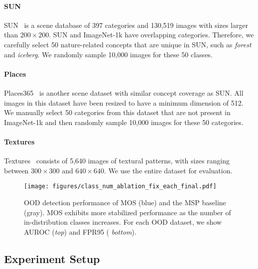 \documentclass[final]{cvpr}
\begin{document}
\paragraph{SUN} SUN~\cite{xiao2010sun} is a scene database of 397 categories and 130,519 images with sizes larger than $200\times200$. 
SUN and ImageNet-1k have overlapping categories. Therefore, we carefully select 50 nature-related concepts that are unique in SUN,  such as \textit{forest} and \textit{iceberg}. We randomly sample 10,000 images for these 50 classes. 
\vspace{-0.4cm}
\paragraph{Places} Places365~\cite{zhou2017places} is another scene dataset with similar concept coverage as SUN. 
All images in this dataset have been resized to have a minimum dimension of 512. We manually select 50 categories from this dataset that are not present in ImageNet-1k and then randomly sample 10,000 images for these 50 categories.

\vspace{-0.5cm}
\paragraph{Textures}  Textures~\cite{cimpoi2014describing} consists of 5,640 images of textural patterns, with sizes ranging between $300\times 300$ and $640 \times 640$. We use the entire dataset for evaluation. 




\begin{figure*}[t]
    \centering
    \vspace{-0.3cm}
    \texttt{[image: figures/class\_num\_ablation\_fix\_each\_final.pdf]}
    \caption{\small{OOD detection performance of MOS (blue) and the MSP baseline (gray). MOS exhibits more stabilized performance as the number of in-distribution classes increases. For each OOD dataset, we show AUROC (\textit{top}) and FPR95 ( \textit{bottom}).}}
    \label{fig:exp_class_num_ablation_fix_each}
    \vspace{-0.3cm}
\end{figure*}

\subsection{Experiment Setup}
\label{sec:exp_setup}
\vspace{-0.1cm}
\end{document}
